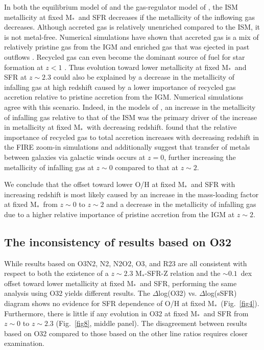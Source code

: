 \documentclass[iop,twocolappendix]{emulateapj}
\newcommand{\mstar}{$\mbox{M}_*$}
\begin{document}
In both the equilibrium model of \citet{dav12} and the gas-regulator model of \citet{lil13},
 the ISM metallicity at fixed \mstar\ and SFR decreases if the metallicity of the inflowing gas decreases.
  Although accreted gas is relatively unenriched compared to the ISM, it is not metal-free.
  Numerical simulations have shown that accreted gas is a mix of relatively pristine gas from the IGM
 and enriched gas that was ejected in past outflows \citep[e.g.,][]{opp10,seg16,ang17}.
  Recycled gas can even become the dominant source of fuel for star formation at $z<1$ \citep{opp10}.
  Thus evolution toward lower metallicity at fixed \mstar\ and SFR at $z\sim2.3$ could also be
 explained by a decrease in the metallicity of infalling gas at high redshift caused by a lower importance
 of recycled gas accretion relative to pristine accretion from the IGM.  Numerical simulations agree with this
 scenario.  Indeed, in the models of \citet{dav11}, an increase in the metallicity of infalling gas relative to that of
 the ISM was the primary driver of the increase in metallicity at fixed \mstar\ with decreasing redshift.
  \citet{ang17} found that the relative importance of recycled gas to total accretion increases with
 decreasing redshift in the FIRE zoom-in simulations
 and additionally suggest that transfer of metals between galaxies via galactic winds occurs at $z=0$,
 further increasing the metallicity of infalling gas at $z\sim0$ compared to that at $z\sim2$.

We conclude that the offset toward lower O/H at fixed \mstar\ and SFR with increasing redshift
 is most likely caused by an increase in the mass-loading factor at fixed \mstar\ from $z\sim0$ to $z\sim2$
 and a decrease in the metallicity of infalling gas due to a higher relative importance of pristine accretion
 from the IGM at $z\sim2$.

\subsection{The inconsistency of results based on O32}\label{sec:o32}

While results based on O3N2, N2, N2O2, O3, and R23 are all consistent with respect to both
 the existence of a $z\sim2.3$ \mstar-SFR-Z relation and the $\sim0.1$~dex offset toward
 lower metallicity at fixed \mstar\ and SFR, performing the same analysis using O32
 yields different results.  The $\Delta$log(O32) vs. $\Delta$log(sSFR) diagram shows
 no evidence for SFR dependence of O/H at fixed \mstar\ (Fig.~\ref{fig4}).  Furthermore,
 there is little if any evolution in O32 at fixed \mstar\ and SFR from $z\sim0$ to $z\sim2.3$
 (Fig.~\ref{fig8}, middle panel).
  The disagreement between results based on O32 compared to those based on the other line ratios
 requires closer examination.
\end{document}
